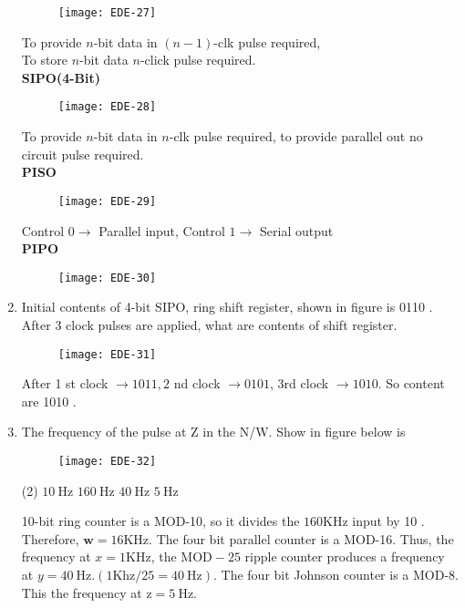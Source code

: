 \begin{enumerate}
\begin{figure}[H]
	\centering
	\texttt{[image: EDE-27]}
\end{figure}
To provide $n$-bit data in $(n-1)$-clk pulse required, \\
To store $n$-bit data $n$-click pulse required.\\
\textbf{SIPO(4-Bit)}
\begin{figure}[H]
	\centering
	\texttt{[image: EDE-28]}
\end{figure}
To provide $n$-bit data in $n$-clk pulse required, to provide parallel out no circuit pulse required.\\
\textbf { PISO }
\begin{figure}[H]
	\centering
	\texttt{[image: EDE-29]}
\end{figure}
Control $0 \rightarrow$ Parallel input, Control $1 \rightarrow$ Serial output\\
\textbf{ PIPO}
\begin{figure}[H]
	\centering
	\texttt{[image: EDE-30]}
\end{figure}
\item Initial contents of 4-bit SIPO, ring shift register, shown in figure is 0110 . After 3 clock pulses are applied, what are contents of shift register.
\begin{figure}[H]
	\centering
	\texttt{[image: EDE-31]}
\end{figure}
\begin{answer}
	After 1 st clock $\rightarrow 1011,2$ nd clock $\rightarrow 0101$, 3rd clock $\rightarrow 1010$. So content are 1010 .
\end{answer}
\item The frequency of the pulse at $\mathrm{Z}$ in the N/W. Show in figure below is
\begin{figure}[H]
	\centering
	\texttt{[image: EDE-32]}
\end{figure}
 \begin{tasks}(2)
	\task[\textbf{a.}]$10 \mathrm{~Hz}$
	\task[\textbf{b.}]$160 \mathrm{~Hz}$
	\task[\textbf{c.}]$40 \mathrm{~Hz}$
	\task[\textbf{d.}] $5 \mathrm{~Hz}$
\end{tasks}
\begin{answer}
10-bit ring counter is a MOD-10, so it divides the $160 \mathrm{KHz}$ input by 10 . Therefore, $\mathbf{w}=16 \mathrm{KHz}$. The four bit parallel counter is a MOD-16. Thus, the frequency at $x=1 \mathrm{KHz}$, the $\mathrm{MOD}-25$ ripple counter produces a frequency at $y=40 \mathrm{~Hz} .(1 \mathrm{Khz} / 25=40 \mathrm{~Hz})$. The four bit Johnson counter is a MOD-8. This the frequency at $\mathrm{z}=5 \mathrm{~Hz}$.

\end{answer}
\end{enumerate}

